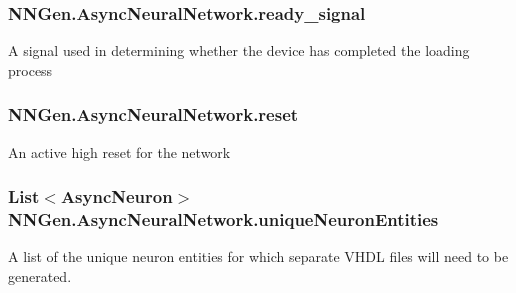 \subsubsection[{ready\+\_\+signal}]{ N\+N\+Gen.\+Async\+Neural\+Network.\+ready\+\_\+signal\hspace{0.3cm}{\ttfamily [get]}}\label{class_n_n_gen_1_1_async_neural_network_ade446cacb56d0ddf2aae1510e2425591}


A signal used in determining whether the device has completed the loading process 

\hypertarget{class_n_n_gen_1_1_async_neural_network_a7205fb71714f4aa3c144c72c44af2787}{}
\subsubsection[{reset}]{ N\+N\+Gen.\+Async\+Neural\+Network.\+reset\hspace{0.3cm}{\ttfamily [get]}}\label{class_n_n_gen_1_1_async_neural_network_a7205fb71714f4aa3c144c72c44af2787}


An active high reset for the network 

\hypertarget{class_n_n_gen_1_1_async_neural_network_a0f6322f9b2736a40e4f63b3107f8981d}{}
\subsubsection[{unique\+Neuron\+Entities}]{\setlength{\rightskip}{0pt plus 5cm}List$<${\bf Async\+Neuron}$>$ N\+N\+Gen.\+Async\+Neural\+Network.\+unique\+Neuron\+Entities\hspace{0.3cm}{\ttfamily [get]}}\label{class_n_n_gen_1_1_async_neural_network_a0f6322f9b2736a40e4f63b3107f8981d}


A list of the unique neuron entities for which separate V\+H\+D\+L files will need to be generated. 

\hypertarget{class_n_n_gen_1_1_async_neural_network_a94241380da2839193000b7c3e78fe8cd}{}
